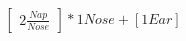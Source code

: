 \documentclass[preview]{standalone}
\begin{document}
\begin{align*}
\begin{bmatrix} 2 \frac{Nap}{Nose} \end{bmatrix} * 1 Nose + [1 Ear]
\end{align*}
\end{document}
